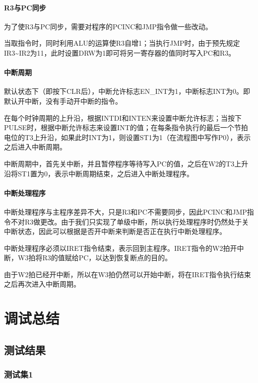 \documentclass[lang=cn,11pt,a4paper,cite=authornum]{paper}
\begin{document}
\paragraph{R3与PC同步}

为了使R3与PC同步，需要对程序的PCINC和JMP指令做一些改动。

当取指令时，同时利用ALU的运算使R3自增1；当执行JMP时，由于预先规定IR3\textasciitilde IR2为11，此时设置DRW为1即可将另一寄存器的值同时写入PC和R3。

\paragraph{中断周期}

默认状态下（即按下CLR后），中断允许标志EN\_INT为1，中断标志INT为0。即默认开中断，没有手动开中断的指令。

在每个时钟周期的上升沿，根据INTDI和INTEN来设置中断允许标志；当按下PULSE时，根据中断允许标志来设置INT的值；在每条指令执行的最后一个节拍电位的T3上升沿，如果此时INT为1，则设置ST1为1（在流程图中写作P0），表示之后进入中断周期。

中断周期中，首先关中断，并且暂停程序等待写入PC的值，之后在W2的T3上升沿将ST1置为0，表示中断周期结束，之后进入中断处理程序。

\paragraph{中断处理程序}

中断处理程序与主程序差异不大，只是R3和PC不需要同步，因此PCINC和JMP指令不对R3做更改。由于我们只实现了单级中断，所以执行处理程序时仍然处于关中断状态，因此可以根据是否开中断来判断是否正在执行中断处理程序。

中断处理程序必须以IRET指令结束，表示回到主程序。IRET指令的W2拍开中断，W3拍将R3的值赋给PC，以达到恢复断点的目的。

由于W2拍已经开中断，所以在W3拍仍然可以开始中断，将在IRET指令执行结束之后再次进入中断周期。

\section{调试总结}

\subsection{测试结果}

\subsubsection{测试集1}
\end{document}
